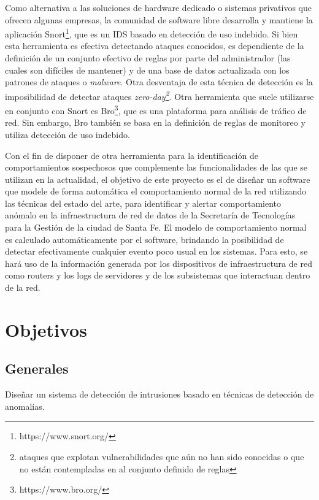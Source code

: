 Como alternativa a las soluciones de hardware dedicado o sistemas privativos que ofrecen algunas empresas, la comunidad de software libre desarrolla y mantiene la aplicación Snort\footnote{https://www.snort.org/}, que es un IDS basado en detección de uso indebido. Si bien esta herramienta es efectiva detectando ataques conocidos, es dependiente de la definición de un conjunto efectivo de reglas por parte del administrador (las cuales son difíciles de mantener) y de una base de datos actualizada con los patrones de ataques o \textit{malware}. Otra desventaja de esta técnica de detección es la imposibilidad de detectar ataques \textit{zero-day\footnote{ataques que explotan vulnerabilidades que aún no han sido conocidas o que no están contempladas en al conjunto definido de reglas}}\cite{Milenkoski:2015:ECI:2808687.2808691}. Otra herramienta que suele utilizarse en conjunto con Snort es Bro\footnote{https://www.bro.org/}, que es una plataforma para análisis de tráfico de red. Sin embargo, Bro también se basa en la definición de reglas de monitoreo y utiliza detección de uso indebido. \par

Con el fin de disponer de otra herramienta para la identificación de comportamientos sospechosos que complemente las funcionalidades de las que se utilizan en la actualidad, el objetivo de este proyecto es el de diseñar un software que modele de forma automática el comportamiento normal de la red utilizando las técnicas del estado del arte, para identificar y alertar comportamiento anómalo en la infraestructura de red de datos de la Secretaría de Tecnologías para la Gestión de la ciudad de Santa Fe. El modelo de comportamiento normal es calculado automáticamente por el software, brindando la posibilidad de detectar efectivamente cualquier evento poco usual en los sistemas. Para esto, se hará uso de la información generada por los dispositivos de infraestructura de red como routers y los logs de servidores y de los subsistemas que interactuan dentro de la red.

\section*{Objetivos}
\subsection*{Generales}
Diseñar un sistema de detección de intrusiones basado en técnicas de detección de anomalías.
